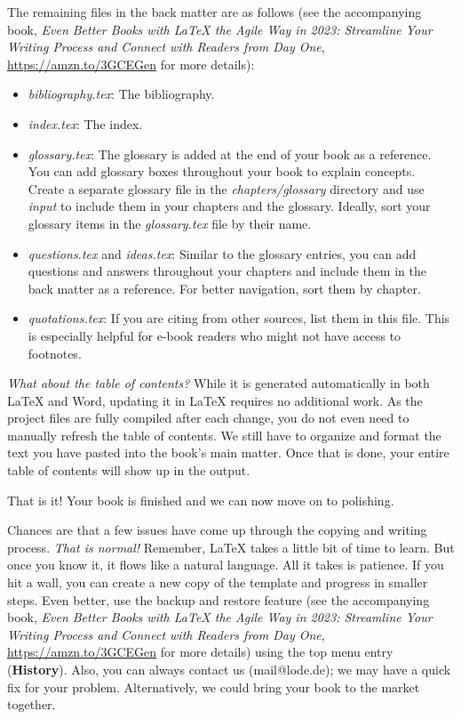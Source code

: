 The remaining files in the back matter are as follows (see the accompanying book, \textit{Even Better Books with LaTeX the Agile Way in 2023: Streamline Your Writing Process and Connect with Readers from Day One}, \url{https://amzn.to/3GCEGen} for more details):

\begin{itemize}
    \item \textit{bibliography.tex}: The bibliography.
    \item \textit{index.tex}: The index.
    \item \textit{glossary.tex}: The glossary is added at the end of your book as a reference. You can add glossary boxes throughout your book to explain concepts. Create a separate glossary file in the \textit{chapters/glossary} directory and use \textit{input} to include them in your chapters and the glossary. Ideally, sort your glossary items in the \textit{glossary.tex} file by their name.
    \item \textit{questions.tex} and \textit{ideas.tex}: Similar to the glossary entries, you can add questions and answers throughout your chapters and include them in the back matter as a reference. For better navigation, sort them by chapter.
    \item \textit{quotations.tex}: If you are citing from other sources, list them in this file. This is especially helpful for e-book readers who might not have access to footnotes.
\end{itemize}


\textit{What about the table of contents?} While it is generated automatically in both LaTeX and Word, updating it in LaTeX requires no additional work. As the project files are fully compiled after each change, you do not even need to manually refresh the table of contents. We still have to organize and format the text you have pasted into the book's main matter. Once that is done, your entire table of contents will show up in the output.

That is it! Your book is finished and we can now move on to polishing.

Chances are that a few issues have come up through the copying and writing process. \textit{That is normal!} Remember, LaTeX takes a little bit of time to learn. But once you know it, it flows like a natural language. All it takes is patience. If you hit a wall, you can create a new copy of the template and progress in smaller steps. Even better, use the backup and restore feature (see the accompanying book, \textit{Even Better Books with LaTeX the Agile Way in 2023: Streamline Your Writing Process and Connect with Readers from Day One}, \url{https://amzn.to/3GCEGen} for more details) using the top menu entry (\textbf{History}). Also, you can always contact us (mail@lode.de); we may have a quick fix for your problem. Alternatively, we could bring your book to the market together.

